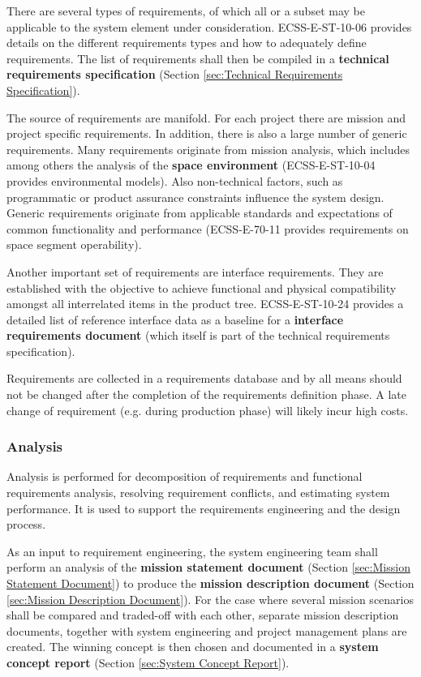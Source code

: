 There are several types of requirements, of which all or a subset may be applicable to the system element under consideration. ECSS-E-ST-10-06 \cite{ECSS-E-ST-10-06} provides details on the different requirements types and how to adequately define requirements. The list of requirements shall then be compiled in a \textbf{technical requirements specification} (Section \ref{sec:Technical Requirements Specification}). 

The source of requirements are manifold. For each project there are mission and project specific requirements. In addition, there is also a large number of generic requirements. Many requirements originate from mission analysis, which includes among others the analysis of the \textbf{space environment} (ECSS-E-ST-10-04 \cite{ECSS-E-ST-10-04} provides environmental models). Also non-technical factors, such as programmatic or product assurance constraints influence the system design. Generic requirements originate from applicable standards and expectations of common functionality and performance (ECSS-E-70-11 \cite{ECSS-E-ST-70-11} provides requirements on space segment operability).

Another important set of requirements are interface requirements. They are established with the objective to achieve functional and physical compatibility amongst all interrelated items in the product tree. ECSS-E-ST-10-24 \cite{ECSS-E-ST-10-24} provides a detailed list of reference interface data as a baseline for a \textbf{interface requirements document} (which itself is part of the technical requirements specification). 

Requirements are collected in a requirements database and by all means should not be changed after the completion of the requirements definition phase. A late change of requirement (e.g. during production phase) will likely incur high costs.

\subsubsection{Analysis}

Analysis is performed for decomposition of requirements and functional requirements analysis, resolving requirement conflicts, and estimating system performance. It is used to support the requirements engineering and the design process.

As an input to requirement engineering, the system engineering team shall perform an analysis of the \textbf{mission statement document} (Section \ref{sec:Mission Statement Document}) to produce the \textbf{mission description document} (Section \ref{sec:Mission Description Document}). For the case where several mission scenarios shall be compared and traded-off with each other, separate mission description documents, together with system engineering and project management plans are created. The winning concept is then chosen and documented in a \textbf{system concept report} (Section \ref{sec:System Concept Report}).

